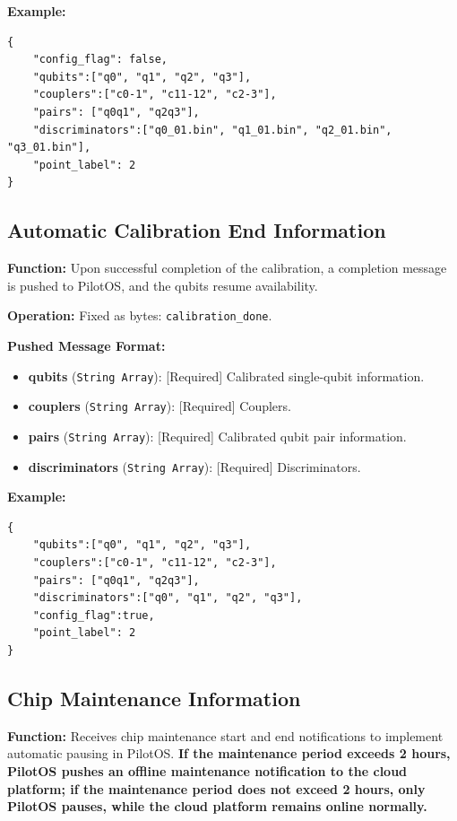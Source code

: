 \documentclass[12pt, a4paper]{article}
\begin{document}
\noindent \textbf{Example:}
\begin{lstlisting}
{
    "config_flag": false,
    "qubits":["q0", "q1", "q2", "q3"],
    "couplers":["c0-1", "c11-12", "c2-3"],
    "pairs": ["q0q1", "q2q3"],
    "discriminators":["q0_01.bin", "q1_01.bin", "q2_01.bin", "q3_01.bin"],
    "point_label": 2
}
\end{lstlisting}

\subsection{Automatic Calibration End Information}

\textbf{Function:} Upon successful completion of the calibration, a completion message is pushed to PilotOS, and the qubits resume availability.

\textbf{Operation:} Fixed as bytes: \texttt{calibration\_done}.

\textbf{Pushed Message Format:}
\begin{itemize}
    \item \textbf{qubits} (\texttt{String Array}): [Required] Calibrated single-qubit information.
    \item \textbf{couplers} (\texttt{String Array}): [Required] Couplers.
    \item \textbf{pairs} (\texttt{String Array}): [Required] Calibrated qubit pair information.
    \item \textbf{discriminators} (\texttt{String Array}): [Required] Discriminators.
\end{itemize}

\noindent \textbf{Example:}
\begin{lstlisting}
{
    "qubits":["q0", "q1", "q2", "q3"],
    "couplers":["c0-1", "c11-12", "c2-3"],
    "pairs": ["q0q1", "q2q3"],
    "discriminators":["q0", "q1", "q2", "q3"],
    "config_flag":true,
    "point_label": 2
}
\end{lstlisting}

\subsection{Chip Maintenance Information}

\textbf{Function:} Receives chip maintenance start and end notifications to implement automatic pausing in PilotOS. \textbf{If the maintenance period exceeds 2 hours, PilotOS pushes an offline maintenance notification to the cloud platform; if the maintenance period does not exceed 2 hours, only PilotOS pauses, while the cloud platform remains online normally.}
\end{document}
